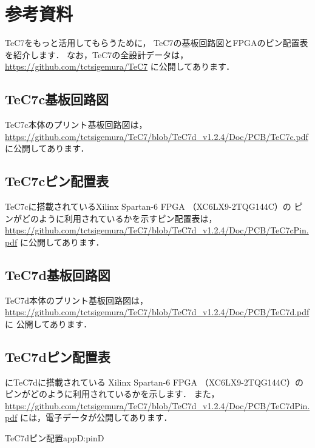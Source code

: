 \renewcommand{\myincludegraphics}[2]{\texttt{[image: appD/\#1]}}

\newpage
\onecolumn
\chapter{参考資料}

TeC7をもっと活用してもらうために，
TeC7の基板回路図とFPGAのピン配置表を紹介します．
なお，TeC7の全設計データは，
\url{https://github.com/tctsigemura/TeC7}
に公開してあります．

\section{TeC7c基板回路図}
TeC7c本体のプリント基板回路図は，
\url{https://github.com/tctsigemura/TeC7/blob/TeC7d_v1.2.4/Doc/PCB/TeC7c.pdf}
に公開してあります．

\section{TeC7cピン配置表}
TeC7cに搭載されているXilinx Spartan-6 FPGA （XC6LX9-2TQG144C）の
ピンがどのように利用されているかを示すピン配置表は，
\url{https://github.com/tctsigemura/TeC7/blob/TeC7d_v1.2.4/Doc/PCB/TeC7cPin.pdf}
に公開してあります．

\section{TeC7d基板回路図}
TeC7d本体のプリント基板回路図は，
\url{https://github.com/tctsigemura/TeC7/blob/TeC7d_v1.2.4/Doc/PCB/TeC7d.pdf}に
公開してあります．

\section{TeC7dピン配置表}
にTeC7dに搭載されている
Xilinx Spartan-6 FPGA （XC6LX9-2TQG144C）の
ピンがどのように利用されているかを示します．
また，
\url{https://github.com/tctsigemura/TeC7/blob/TeC7d_v1.2.4/Doc/PCB/TeC7dPin.pdf}
には，電子データが公開してあります．




\newpage
{}
           {TeC7dピン配置}{appD:pinD}
